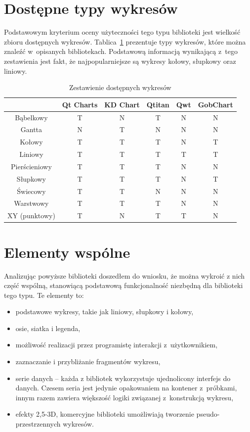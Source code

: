 \section{Dostępne typy wykresów}
Podstawowym kryterium oceny użyteczności tego typu biblioteki jest wielkość zbioru dostępnych wykresów. Tablica~\ref{tab:wykresy} prezentuje typy wykresów, które można znaleźć w~opisanych bibliotekach. Podstawową informacją wynikającą z~tego zestawienia jest fakt, że najpopularniejsze są wykresy kołowy, słupkowy oraz liniowy.
\begin{table}[h]\footnotesize
\centering
\caption{Zestawienie dostępnych wykresów}
\label{tab:wykresy}
\begin{tabular}{|c|c|c|c|c|c|}
\hline
&  Qt Charts & KD Chart & Qtitan & Qwt & GobChart\\
\hline
Bąbelkowy & T & N & T & N & N\\
\hline
Gantta & N & T & N & N & N\\
\hline
Kołowy & T & T & T & N & T\\
\hline
Liniowy & T & T & T & T & T\\
\hline
Pierścieniowy & T & T & T & N & N\\
\hline
Słupkowy & T & T & T & N & T\\
\hline
Świecowy & T & T & N & N & N\\
\hline
Warstwowy & T & T & T & N & N\\
\hline
XY (punktowy) & T & N & T & T & N\\
\hline
\end{tabular}
\end{table}


\section{Elementy wspólne}
Analizując powyższe biblioteki doszedłem do wniosku, że można wykroić z nich część wspólną, stanowiącą podstawową funkcjonalność niezbędną dla biblioteki tego typu. Te elementy to:
\begin{itemize}
\item{podstawowe wykresy, takie jak liniowy, słupkowy i kołowy,}
\item{osie, siatka i legenda,}
\item{możliwość realizacji przez programistę interakcji z~użytkownikiem,}
\item{zaznaczanie i przybliżanie fragmentów wykresu,}
\item{serie danych -- każda z bibliotek wykorzystuje ujednolicony interfejs do danych. Czesem seria jest jedynie opakowaniem na kontener z~próbkami, innym razem zawiera większość logiki związanej z~konstrukcją wykresu,}
\item{efekty 2,5-3D, komercyjne biblioteki umożliwiają tworzenie pseudo-przestrzennych wykresów.}
\end{itemize}

